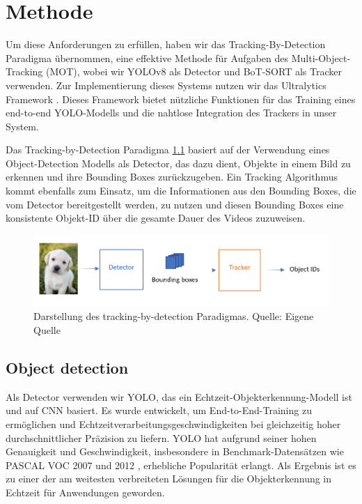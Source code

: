 \chapter{Methode}
Um diese Anforderungen zu erfüllen, haben wir das Tracking-By-Detection Paradigma übernommen, eine effektive Methode für Aufgaben des Multi-Object-Tracking (MOT), wobei wir YOLOv8 \cite{redmon2016look} als Detector und BoT-SORT \cite{aharon2022botsort} als Tracker verwenden. Zur Implementierung dieses Systems nutzen wir das Ultralytics Framework \cite{yolov8_ultralytics}. Dieses Framework bietet nützliche Funktionen für das Training eines end-to-end YOLO-Modells und die nahtlose Integration des Trackers in unser System.

Das Tracking-by-Detection Paradigma \ref{fig:part01:tracing-by-detection} basiert auf der Verwendung eines Object-Detection Modells als Detector, das dazu dient, Objekte in einem Bild zu erkennen und ihre Bounding Boxes zurückzugeben. Ein Tracking Algorithmus kommt ebenfalls zum Einsatz, um die Informationen aus den Bounding Boxes, die vom Detector bereitgestellt werden, zu nutzen und diesen Bounding Boxes eine konsistente Objekt-ID über die gesamte Dauer des Videos zuzuweisen.

\begin{figure}[htbp]
 \centering
 \includegraphics[width=1\textwidth]{gfx/tracking_by_detection.png}
 \caption{Darstellung des tracking-by-detection Paradigmas. Quelle: Eigene Quelle}
 \label{fig:part01:tracing-by-detection}
\end{figure}

\section{Object detection}
\label{sec:intro:motivation}
Als Detector verwenden wir YOLO, das ein Echtzeit-Objekterkennung-Modell ist und auf \acs{CNN} basiert. Es wurde entwickelt, um End-to-End-Training zu ermöglichen und Echtzeitverarbeitungsgeschwindigkeiten bei gleichzeitig hoher durchschnittlicher Präzision zu liefern. YOLO hat aufgrund seiner hohen Genauigkeit und Geschwindigkeit, insbesondere in Benchmark-Datensätzen wie PASCAL VOC 2007 \cite{pascal-voc-2007} und 2012 \cite{pascal-voc-2012}, erhebliche Popularität erlangt. Als Ergebnis ist es zu einer der am weitesten verbreiteten Lösungen für die Objekterkennung in Echtzeit für Anwendungen geworden.

